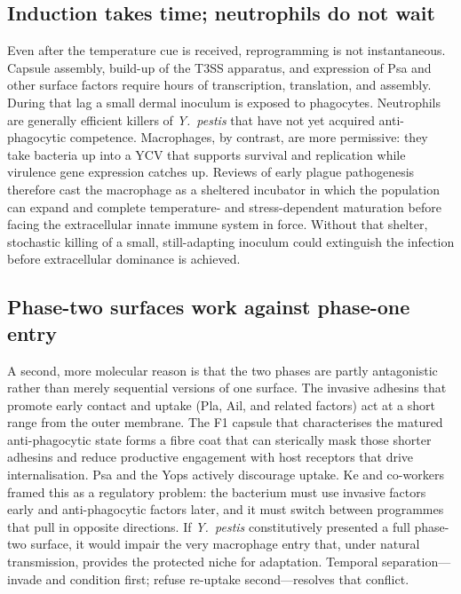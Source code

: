 \documentclass[11pt,a4paper]{article}
\begin{document}
\subsection{Induction takes time; neutrophils do not wait}

Even after the temperature cue is received, reprogramming is not instantaneous. Capsule assembly, build-up of the T3SS apparatus, and expression of Psa and other surface factors require hours of transcription, translation, and assembly. During that lag a small dermal inoculum is exposed to phagocytes. Neutrophils are generally efficient killers of \textit{Y.\ pestis} that have not yet acquired anti-phagocytic competence. Macrophages, by contrast, are more permissive: they take bacteria up into a YCV that supports survival and replication while virulence gene expression catches up. Reviews of early plague pathogenesis therefore cast the macrophage as a sheltered incubator in which the population can expand and complete temperature- and stress-dependent maturation before facing the extracellular innate immune system in force. Without that shelter, stochastic killing of a small, still-adapting inoculum could extinguish the infection before extracellular dominance is achieved.

\subsection{Phase-two surfaces work against phase-one entry}

A second, more molecular reason is that the two phases are partly antagonistic rather than merely sequential versions of one surface. The invasive adhesins that promote early contact and uptake (Pla, Ail, and related factors) act at a short range from the outer membrane. The F1 capsule that characterises the matured anti-phagocytic state forms a fibre coat that can sterically mask those shorter adhesins and reduce productive engagement with host receptors that drive internalisation. Psa and the Yops actively discourage uptake. Ke and co-workers framed this as a regulatory problem: the bacterium must use invasive factors early and anti-phagocytic factors later, and it must switch between programmes that pull in opposite directions. If \textit{Y.\ pestis} constitutively presented a full phase-two surface, it would impair the very macrophage entry that, under natural transmission, provides the protected niche for adaptation. Temporal separation---invade and condition first; refuse re-uptake second---resolves that conflict.
\end{document}
